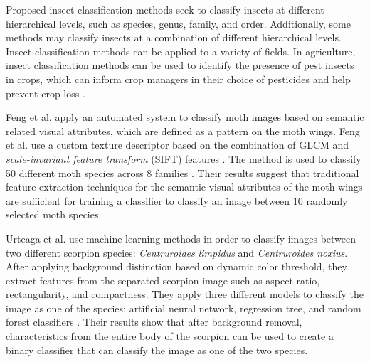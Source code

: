\documentclass{aci}
\numberwithin{equation}{section}
\begin{document}
Proposed insect classification methods seek to classify insects at different
hierarchical levels, such as species, genus, family, and order. Additionally,
some methods may classify insects at a combination of different hierarchical
levels. Insect classification methods can be applied to a variety of fields. In
agriculture, insect classification methods can be used to identify the presence
of pest insects in crops, which can inform crop managers in their choice of
pesticides and help prevent crop loss \cite{liu_pestnet_2019,
    kasinathan_machine_2021}.

Feng et al. \cite{feng_automated_2013} apply an automated system to classify
moth images based on semantic related visual attributes, which are defined as a
pattern on the moth wings. Feng et al. \cite{feng_automated_2013} use a custom
texture descriptor based on the combination of GLCM and \textit{scale-invariant
    feature transform} (SIFT) features \cite{gotlieb_texture_1990,
    lowe_distinctive_2004}. The method is used to classify 50 different moth species
across 8 families \cite{feng_automated_2013}. Their results
\cite{feng_automated_2013} suggest that traditional feature extraction
techniques for the semantic visual attributes of the moth wings are sufficient
for training a classifier to classify an image between 10 randomly selected moth
species.

Urteaga et al. \cite{urteaga_scorpions_2016} use machine learning methods in
order to classify images between two different scorpion species:
\textit{Centruroides limpidus} and \textit{Centruroides noxius}. After applying
background distinction based on dynamic color threshold, they extract features
from the separated scorpion image such as aspect ratio, rectangularity, and
compactness. They apply three different models to classify the image as one of
the species: artificial neural network, regression tree, and random forest
classifiers \cite{urteaga_scorpions_2016}. Their results show that after
background removal, characteristics from the entire body of the scorpion can be
used to create a binary classifier that can classify the image as one of the two
species.
\end{document}
